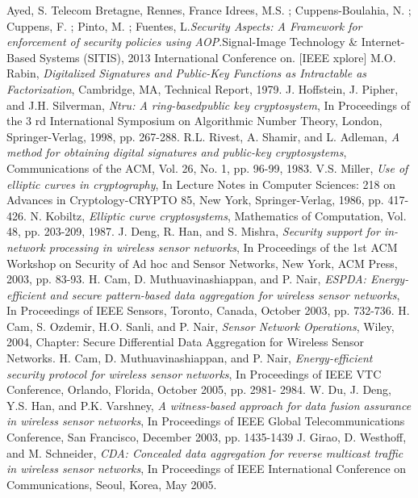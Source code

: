 \documentclass[12pt,a4paper,twoside]{report}
\begin{document}
\begin{thebibliography}{99}
 Ayed, S. Telecom Bretagne, Rennes, France Idrees, M.S. ; Cuppens-Boulahia, N. ; Cuppens, F. ; Pinto, M. ; Fuentes, L.\emph{Security Aspects: A Framework for enforcement of security policies using AOP}.Signal-Image Technology \& Internet-Based Systems (SITIS), 2013 International Conference on. [IEEE xplore]
 M.O. Rabin, \emph{Digitalized Signatures and Public-Key Functions as Intractable as Factorization}, Cambridge, MA, Technical Report, 1979.
 J. Hoffstein, J. Pipher, and J.H. Silverman, \emph{Ntru: A ring-basedpublic key cryptosystem}, In Proceedings of the 3 rd International Symposium on Algorithmic Number Theory, London, Springer-Verlag, 1998, pp. 267-288.
 R.L. Rivest, A. Shamir, and L. Adleman, \emph{A method for obtaining digital signatures and public-key cryptosystems}, Communications of the ACM, Vol. 26, No. 1, pp. 96-99, 1983.
 V.S. Miller, \emph{Use of elliptic curves in cryptography}, In Lecture Notes in Computer Sciences: 218 on Advances in Cryptology-CRYPTO 85, New York, Springer-Verlag, 1986, pp. 417-426.
 N. Kobiltz, \emph{Elliptic curve cryptosystems}, Mathematics of Computation, Vol. 48, pp. 203-209, 1987.
 J. Deng, R. Han, and S. Mishra, \emph{Security support for in-network processing in wireless sensor networks}, In Proceedings of the 1st ACM Workshop on Security of Ad hoc and Sensor Networks, New York, ACM Press, 2003, pp. 83-93.
 H. Cam, D. Muthuavinashiappan, and P. Nair, \emph{ESPDA: Energy-efficient and secure pattern-based data aggregation for wireless sensor networks}, In Proceedings of IEEE Sensors, Toronto, Canada, October 2003, pp. 732-736.
 H. Cam, S. Ozdemir, H.O. Sanli, and P. Nair, \emph{Sensor Network Operations}, Wiley, 2004, Chapter: Secure Differential Data Aggregation for Wireless Sensor Networks.
 H. Cam, D. Muthuavinashiappan, and P. Nair, \emph{Energy-efficient security protocol for wireless sensor networks}, In Proceedings of IEEE VTC Conference, Orlando, Florida, October 2005, pp. 2981- 2984.
 W. Du, J. Deng, Y.S. Han, and P.K. Varshney, \emph{A witness-based approach for data fusion assurance in wireless sensor networks}, In Proceedings of IEEE Global Telecommunications Conference, San Francisco, December 2003, pp. 1435-1439
 J. Girao, D. Westhoff, and M. Schneider, \emph{CDA: Concealed data aggregation for reverse multicast traffic in wireless sensor networks}, In Proceedings of IEEE International Conference on  Communications, Seoul, Korea, May 2005.

\end{thebibliography}
\end{document}
